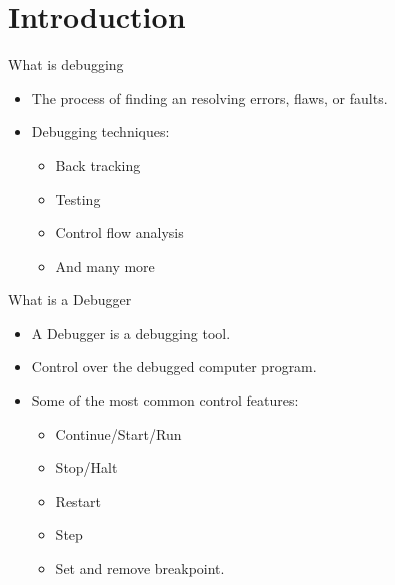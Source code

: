 \section{Introduction}

\begin{frame}{What is debugging}
    \begin{itemize}
        \item The process of finding an resolving errors, flaws, or faults.
        \item Debugging techniques:
    	\begin{itemize} %
    	    \item Back tracking
    	    \item Testing
    	    \item Control flow analysis
    	    \item And many more
    	\end{itemize}
    \end{itemize}
\end{frame}


\begin{frame}{What is a Debugger}
    \begin{itemize}
        \item A Debugger is a debugging tool.
        \item Control over the debugged computer program.
        \item Some of the most common control features:
    	\begin{itemize}
    	    \item Continue/Start/Run
    	    \item Stop/Halt
    	    \item Restart
    	    \item Step
    	    \item Set and remove breakpoint.
    	\end{itemize}
    \end{itemize}
\end{frame}

